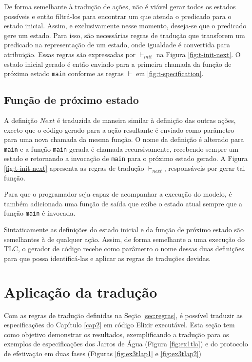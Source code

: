 De forma semelhante à tradução de ações, não é viável gerar todos os estados
possíveis e então filtrá-los para encontrar um que atenda o predicado para o
estado inicial. Assim, e exclusivamente nesse momento, deseja-se que o predicado
gere um estado. Para isso, são necessárias regras de tradução que transforem um
predicado na representação de um estado, onde igualdade é convertida para
atribuição. Essas regras são expressadas por $\vdash_{init}$ na Figura
\ref{fig:t-init-next}. O estado inicial gerado é então enviado para a primeira
chamada da função de próximo estado \texttt{main} conforme as regras $\vdash$ em \ref{fig:t-specification}.

\subsection{Função de próximo estado}

A definição $Next$ é traduzida de maneira similar à definição das outras ações,
exceto que o código gerado para a ação resultante é enviado como parâmetro para
uma nova chamada da mesma função. O nome da definição é alterado para
\texttt{main} e a função \texttt{main} gerada é chamada recursivamente,
recebendo sempre um estado e retornando a invocação de \texttt{main} para o
próximo estado gerado. A Figura \ref{fig:t-init-next} apresenta as regras de
tradução $\vdash_{next}$, responsáveis por gerar tal função.

Para que o programador seja capaz de acompanhar a execução do modelo, é também
adicionada uma função de saída que exibe o estado atual sempre que a função
\texttt{main} é invocada.



Sintaticamente as definições do estado inicial e da função de próximo estado são
semelhantes à de qualquer ação. Assim, de forma semelhante a uma execução do
TLC, o gerador de código recebe como parâmetro o nome dessas duas definições
para que possa identificá-las e aplicar as regras de traduções devidas.

\section{Aplicação da tradução}
\label{sec:validacao}

Com as regras de tradução definidas na Seção \ref{sec:regras}, é possível
traduzir as especificações do Capítulo \ref{cap2} em código Elixir executável.
Esta seção tem como objetivo demonstrar os resultados, exemplificando a tradução
para os exemplos de especificações dos Jarros de Água (Figura \ref{fig:ex1tla})
e do protocolo de efetivação em duas fases (Figuras \ref{fig:ex3tlap1} e
\ref{fig:ex3tlap2})

